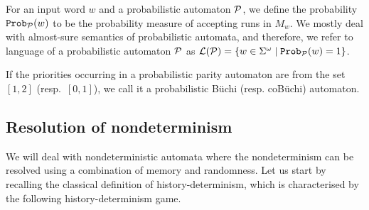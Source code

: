 For an input word $w$ and a probabilistic automaton $\mathcal{P}$, we define the probability $\mathtt{Prob}_{\mathcal{P}}(w)$ to be the probability measure of accepting runs in $M_w$.  We mostly deal with almost-sure semantics of probabilistic automata, and therefore, we refer to language of a probabilistic automaton $\mathcal{P}$ as $\mathcal{L}(\mathcal{P}) = \{w\in \Sigma^\omega\mid \mathtt{Prob}_{\mathcal{P}}(w) = 1\}$.

If the priorities occurring in a probabilistic parity automaton are from the set $[1,2]$ (resp.\ $[0,1]$), we call it a probabilistic B\"uchi (resp. coB\"uchi) automaton. 




\subsection{Resolution of nondeterminism}
We will deal with nondeterministic automata where the nondeterminism can be resolved using a combination of memory and randomness. Let us start by recalling the classical definition of history-determinism, which is characterised by the following history-determinism game.

